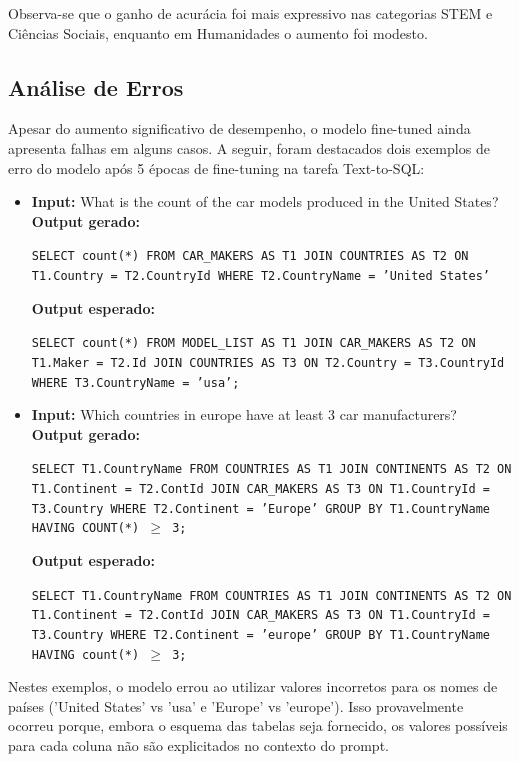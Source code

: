 \documentclass[journal,onecolumn]{IEEEtran}
\begin{document}
Observa-se que o ganho de acurácia foi mais expressivo nas categorias STEM e Ciências Sociais, enquanto em Humanidades o aumento foi modesto.

\subsection{Análise de Erros}

Apesar do aumento significativo de desempenho, o modelo fine-tuned ainda apresenta falhas em alguns casos. A seguir, foram destacados dois exemplos de erro do modelo após 5 épocas de fine-tuning na tarefa Text-to-SQL:

\begin{itemize}
    \item \textbf{Input:} What is the count of the car models produced in the United States?\\
        \textbf{Output gerado:}
        \begin{flushleft}
        \texttt{SELECT count(*) FROM CAR\_MAKERS AS T1 JOIN COUNTRIES AS T2 ON T1.Country  =  T2.CountryId WHERE T2.CountryName  =  'United States'}
        \end{flushleft}
        \textbf{Output esperado:}
        \begin{flushleft}
        \texttt{SELECT count(*) FROM MODEL\_LIST AS T1 JOIN CAR\_MAKERS AS T2 ON T1.Maker  =  T2.Id JOIN COUNTRIES AS T3 ON T2.Country  =  T3.CountryId WHERE T3.CountryName  =  'usa';}
        \end{flushleft}

    \item \textbf{Input:} Which countries in europe have at least 3 car manufacturers?\\
        \textbf{Output gerado:}
        \begin{flushleft}
        \texttt{SELECT T1.CountryName FROM COUNTRIES AS T1 JOIN CONTINENTS AS T2 ON T1.Continent  =  T2.ContId JOIN CAR\_MAKERS AS T3 ON T1.CountryId  =  T3.Country WHERE T2.Continent  =  'Europe' GROUP BY T1.CountryName HAVING COUNT(*)  $\geq$  3;}
        \end{flushleft}
        \textbf{Output esperado:}
        \begin{flushleft}
        \texttt{SELECT T1.CountryName FROM COUNTRIES AS T1 JOIN CONTINENTS AS T2 ON T1.Continent  =  T2.ContId JOIN CAR\_MAKERS AS T3 ON T1.CountryId  =  T3.Country WHERE T2.Continent  =  'europe' GROUP BY T1.CountryName HAVING count(*)  $\geq$  3;}
        \end{flushleft}
\end{itemize}
Nestes exemplos, o modelo errou ao utilizar valores incorretos para os nomes de países ('United States' vs 'usa' e 'Europe' vs 'europe'). Isso provavelmente ocorreu porque, embora o esquema das tabelas seja fornecido, os valores possíveis para cada coluna não são explicitados no contexto do prompt.
\end{document}
